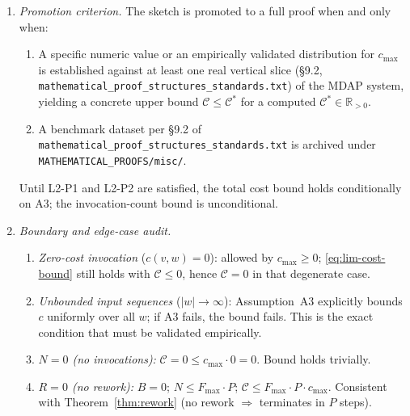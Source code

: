 \documentclass[12pt]{article}
\theoremstyle{definition}
\newcommand{\code}[1]{\texttt{#1}}
\newcommand{\ProofStd}{\code{mathematical\_proof\_\allowbreak structures\_standards.txt}}
\begin{document}
\begin{enumerate}
    \item \emph{Promotion criterion.}
          The sketch is promoted to a full proof when and only when:
          \begin{enumerate}
              \item[L2-P1] A specific numeric value or an empirically
                           validated distribution for $c_{\max}$ is
                           established against at least one real vertical
                           slice (\S9.2, \ProofStd{}) of the MDAP system,
                           yielding a concrete upper bound
                           $\mathcal{C} \leq \mathcal{C}^{*}$ for a
                           computed $\mathcal{C}^{*} \in \mathbb{R}_{>0}$.
              \item[L2-P2] A benchmark dataset per \S9.2 of \ProofStd{}
                           is archived under
                           \code{MATHEMATICAL\_\allowbreak PROOFS/misc/}.
          \end{enumerate}
          Until L2-P1 and L2-P2 are satisfied, the total cost bound
          holds conditionally on A3; the invocation-count bound is
          unconditional.

    \item \emph{Boundary and edge-case audit.}
          \begin{enumerate}
              \item[L2-E1] \emph{Zero-cost invocation} ($c(v,w) = 0$):
                           allowed by $c_{\max} \geq 0$;
                           \eqref{eq:lim-cost-bound} still holds with
                           $\mathcal{C} \leq 0$, hence $\mathcal{C} = 0$
                           in that degenerate case.
              \item[L2-E2] \emph{Unbounded input sequences} ($|w|
                           \to \infty$): Assumption~A3 explicitly
                           bounds $c$ uniformly over all $w$; if A3
                           fails, the bound fails.  This is the exact
                           condition that must be validated empirically.
              \item[L2-E3] \emph{$N = 0$ (no invocations):}
                           $\mathcal{C} = 0 \leq c_{\max} \cdot 0 = 0$.
                           Bound holds trivially.
              \item[L2-E4] \emph{$R = 0$ (no rework):}
                           $B = 0$; $N \leq F_{\max} \cdot P$;
                           $\mathcal{C} \leq F_{\max} \cdot P \cdot
                           c_{\max}$.  Consistent with
                           Theorem~\ref{thm:rework} (no rework
                           $\Rightarrow$ terminates in $P$ steps).
          \end{enumerate}


\end{enumerate}
\end{document}
